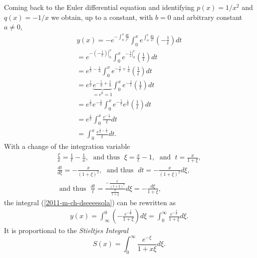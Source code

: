 Coming back to the Euler differential equation and identifying
$p(x)=1/x^2$ and $q(x) = - 1/x$ we obtain, up to a constant,  with $b=0$ and arbitrary constant $a\neq 0$,
\begin{equation}
\begin{split}
y(x)=
-  e^{ - \int_a^x \frac{ dt}{t^2}} \int_0^x e^{ \int_a^t \frac{ ds}{s^2}} \left(-\frac{ 1}{t}\right) dt
\\
=
  e^{ - \left. \left(-\frac{1}{t}\right )\right|_a^x} \int_0^x e^{  \left. -\frac{1}{s}\right|_a^t} \left(\frac{ 1}{t}\right) dt
\\
=
  e^{ \frac{1}{x} -  \frac{1}{a} } \int_0^x e^{  -\frac{1}{t} +  \frac{1}{a} } \left(\frac{ 1}{t}\right) dt
\\
=
  e^{ \frac{1}{x}}\underbrace{e^{ -  \frac{1}{a} + \frac{1}{a}}}_{=e^0=1} \int_0^x e^{ -\frac{1}{t} } \left(\frac{ 1}{t}\right) dt
\\
=
  e^{ \frac{1}{x}}e^{ -  \frac{1}{a} } \int_0^x e^{ -\frac{1}{t} }e^{ \frac{1}{a} } \left(\frac{ 1}{t}\right) dt
\\
=
e^{   \frac{1}{x}} \int_0^x  \frac{ e^{ - \frac{1}{t}}}{t} dt
\\
=
 \int_0^x  \frac{ e^{ \frac{1}{x} -\frac{1}{t}}}{t} dt.
\end{split}
\label{2011-m-ch-dseeeesola}
\end{equation}
With a change of the integration variable
\begin{equation}
\begin{split}
\frac{\xi}{x} = \frac{1}{t}-\frac{1}{x}
, \; \textrm{ and thus }  \;
\xi = \frac{x}{t}-1
, \;  \textrm{ and } \;
t =  \frac{x}{1+ \xi}
, \\
\frac{dt}{d\xi } =  -\frac{x}{(1+ \xi)^2}  , \;
\textrm{ and thus }  \;
dt =  -\frac{x}{(1+ \xi)^2} d\xi, \;    \\
\textrm{ and thus }  \;
\frac{dt}{t } =   \frac{-\frac{x}{(1+ \xi)^2}}{\frac{x}{1+ \xi}} d\xi
=   -\frac{ d\xi}{1+ \xi},
\end{split}
\label{2011-m-ch-dseeans}
\end{equation}
the integral (\ref{2011-m-ch-dseeeesola}) can be rewritten as
\begin{equation}
\begin{split}
y(x)= \int_{\infty}^0
\left(-\frac{e^{-\frac{\xi}{x}}}{1+\xi}\right) d\xi
= \int_0^\infty
\frac{e^{-\frac{\xi}{x}}}{1+\xi} d\xi .
\end{split}
\label{2011-m-ch-dseefasol}
\end{equation}
It is proportional to the
{\em Stieltjes Integral}
\cite{Bender-Orszag,Boyd99thedevil}
\begin{equation}
S(x)= \int_0^\infty
\frac{e^{-\xi}}{1+x\xi} d\xi .
\label{2012-m-ch-ds-si}
\end{equation}


